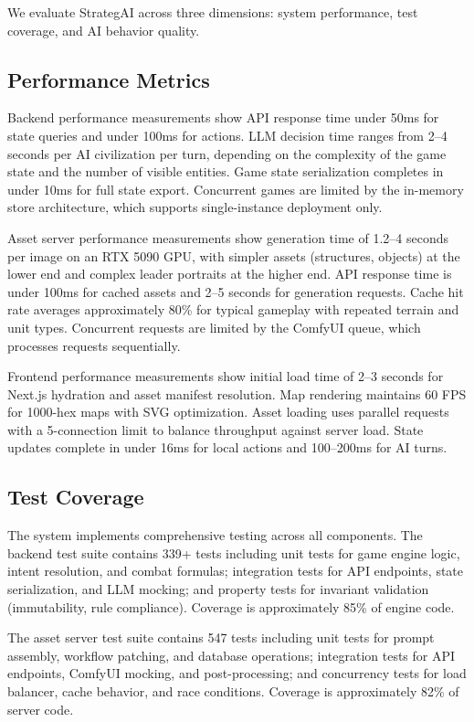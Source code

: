 \documentclass[conference]{IEEEtran}
\begin{document}
We evaluate StrategAI across three dimensions: system performance, test coverage, and AI behavior quality.

\subsection{Performance Metrics}

Backend performance measurements show API response time under 50ms for state queries and under 100ms for actions. LLM decision time ranges from 2--4 seconds per AI civilization per turn, depending on the complexity of the game state and the number of visible entities. Game state serialization completes in under 10ms for full state export. Concurrent games are limited by the in-memory store architecture, which supports single-instance deployment only.

Asset server performance measurements show generation time of 1.2--4 seconds per image on an RTX 5090 GPU, with simpler assets (structures, objects) at the lower end and complex leader portraits at the higher end. API response time is under 100ms for cached assets and 2--5 seconds for generation requests. Cache hit rate averages approximately 80\% for typical gameplay with repeated terrain and unit types. Concurrent requests are limited by the ComfyUI queue, which processes requests sequentially.

Frontend performance measurements show initial load time of 2--3 seconds for Next.js hydration and asset manifest resolution. Map rendering maintains 60 FPS for 1000-hex maps with SVG optimization. Asset loading uses parallel requests with a 5-connection limit to balance throughput against server load. State updates complete in under 16ms for local actions and 100--200ms for AI turns.

\subsection{Test Coverage}

The system implements comprehensive testing across all components. The backend test suite contains 339+ tests including unit tests for game engine logic, intent resolution, and combat formulas; integration tests for API endpoints, state serialization, and LLM mocking; and property tests for invariant validation (immutability, rule compliance). Coverage is approximately 85\% of engine code.

The asset server test suite contains 547 tests including unit tests for prompt assembly, workflow patching, and database operations; integration tests for API endpoints, ComfyUI mocking, and post-processing; and concurrency tests for load balancer, cache behavior, and race conditions. Coverage is approximately 82\% of server code.
\end{document}
